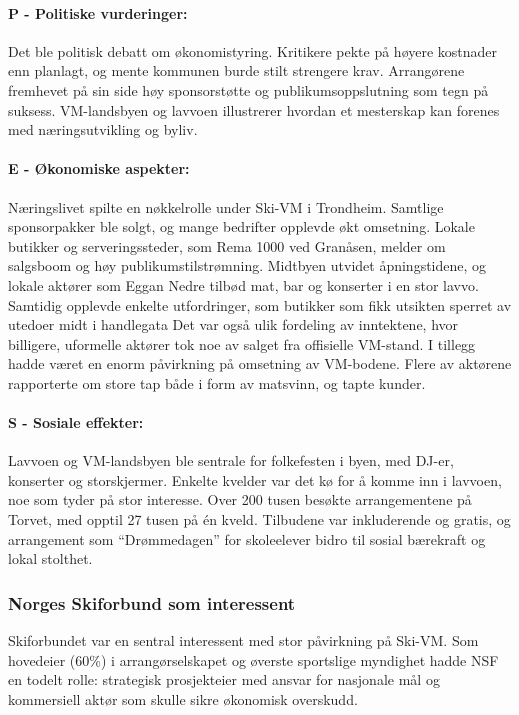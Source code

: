 \paragraph{P - Politiske vurderinger:}
Det ble politisk debatt om økonomistyring. Kritikere pekte på høyere kostnader enn planlagt, og mente kommunen burde stilt strengere krav\parencite{nettavisenKritikk}. Arrangørene fremhevet på sin side høy sponsorstøtte og publikumsoppslutning som tegn på suksess\parencite{kom24Sponsorsalg}. VM-landsbyen og lavvoen illustrerer hvordan et mesterskap kan forenes med næringsutvikling og byliv.

\paragraph{E - Økonomiske aspekter:}
Næringslivet spilte en nøkkelrolle under Ski-VM i Trondheim. Samtlige sponsorpakker ble solgt, og mange bedrifter opplevde økt omsetning\parencite{kom24Sponsorsalg}. Lokale butikker og serveringssteder, som Rema 1000 ved Granåsen, melder om salgsboom og høy publikumstilstrømning\parencite{nettavisenRema}. Midtbyen utvidet åpningstidene, og lokale aktører som Eggan Nedre tilbød mat, bar og konserter i en stor lavvo\parencite{midtbyenProgram}. Samtidig opplevde enkelte utfordringer, som butikker som fikk utsikten sperret av utedoer midt i handlegata\parencite{nettavisenToalett} Det var også ulik fordeling av inntektene, hvor billigere, uformelle aktører tok noe av salget fra offisielle VM-stand\parencite{nettavisenRema}. I tillegg hadde været en enorm påvirkning på omsetning av VM-bodene. Flere av aktørene rapporterte om store tap både i form av matsvinn, og tapte kunder\parencite{innherredTragedie}.

\paragraph{S - Sosiale effekter:}
Lavvoen og VM-landsbyen ble sentrale for folkefesten i byen, med DJ-er, konserter og 
storskjermer. Enkelte kvelder var det kø for å komme inn i lavvoen, noe som tyder på stor 
interesse. Over 200 tusen besøkte arrangementene på Torvet, med opptil 27 tusen på én kveld\parencite{wikipediaSkiVM}. 
Tilbudene var inkluderende og gratis, og arrangement som “Drømmedagen” for skoleelever bidro til 
sosial bærekraft og lokal stolthet\parencite{wikipediaSkiVM}.

\subsubsection{Norges Skiforbund som interessent}
Skiforbundet var en sentral interessent med stor påvirkning på Ski-VM. Som hovedeier (60\%) i arrangørselskapet og øverste sportslige myndighet hadde NSF en todelt rolle: strategisk prosjekteier med ansvar for nasjonale mål og kommersiell aktør som skulle sikre økonomisk overskudd\parencite{ProffSkiVM2025}.

